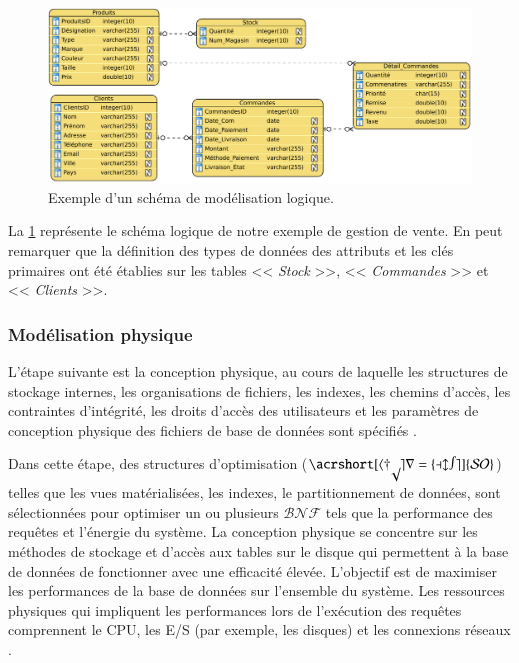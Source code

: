\begin{figure}
\begin{center}
\includegraphics[scale=0.6]{chapitre2/chap2Fig/logical-design-ex.pdf}
\caption{Exemple d'un schéma de modélisation logique.}
\label{fig:logical-design-ex}
\end{center}
\end{figure}

\begin{example}
La \ref{fig:logical-design-ex} représente le schéma logique de notre exemple de gestion de vente. En peut remarquer que la définition des types de données des attributs et les clés primaires ont été établies sur les tables << \textit{Stock} >>, << \textit{Commandes} >> et << \textit{Clients} >>.
\end{example}

\subsubsection{Modélisation physique}
L'étape suivante est la conception physique, au cours de laquelle les structures de stockage internes, les organisations de fichiers, les indexes, les chemins d'accès, les contraintes d'intégrité, les droits d'accès des utilisateurs et les paramètres de conception physique des fichiers de base de données sont spécifiés \cite{Elmasri08}.

Dans cette étape, des structures d'optimisation ($\mathcal{\acrshort[hyper=false]{SO}}$) telles que les vues matérialisées, les indexes, le partitionnement de données, sont sélectionnées pour optimiser un ou plusieurs $\mathcal{BNF}$ tels que la performance des requêtes et l'énergie du système. La conception physique se concentre sur les méthodes de stockage et d'accès aux tables sur le disque qui permettent à la base de données de fonctionner avec une efficacité élevée. L'objectif est de maximiser les performances de la base de données sur l'ensemble du système. Les ressources physiques qui impliquent les performances lors de l'exécution des requêtes comprennent le CPU, les E/S (par exemple, les disques) et les connexions réseaux \cite{Lightstone10}.

